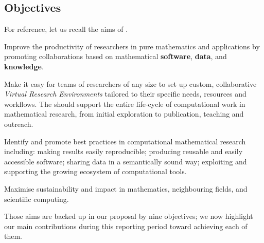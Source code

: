 \subsection{Objectives}


For reference, let us recall the aims of \ODK.
\begin{compactenum}
\item \label{aim:collaboration} Improve the productivity of
  researchers in pure mathematics and applications by promoting
  collaborations based on mathematical \textbf{software},
  \textbf{data}, and \textbf{knowledge}.
\item \label{aim:vre} Make it easy for teams of researchers of any
  size to set up custom, collaborative \emph{Virtual Research
    Environments} tailored to their specific needs, resources and
  workflows. The \VREs should support the entire life-cycle of
  computational work in mathematical research, from initial
  exploration to publication, teaching and outreach.
\item \label{aim:sharing} Identify and promote best practices in
  computational mathematical research including: making results easily
  reproducible; producing reusable and easily accessible
  software; sharing data in a semantically sound way; exploiting and
  supporting the growing ecosystem of computational tools.
\item \label{aim:impact} Maximise sustainability and impact in
  mathematics, neighbouring fields, and scientific computing.
\end{compactenum}

Those aims are backed up in our proposal by nine objectives; we now
highlight our main contributions during this reporting period toward
achieving each of them.

